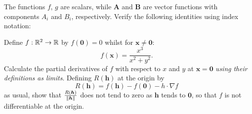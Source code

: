 
\setcounter{question}{36}
\question The functions $f$, $g$ are scalars, while $\bm A$ and $\bm B$ are vector functions with components $A_i$ and $B_i$, respectively. Verify the following identities using index notation:

\setcounter{question}{46}
\question Define $f: \mathbb{R}^2 \to \mathbb{R}$ by $f(\bm 0) = 0$ whilst for $\bm x \neq \bm 0$:
\[ f(\bm x) = \frac{x^3}{x^2 + y^2}. \]
Calculate the partial derivatives of $f$ with respect to $x$ and $y$ at $\bm x = \bm 0$ \emph{using their definitions as limits}. 
Defining $R(\bm h)$ at the origin by
\[R(\bm h) = f(\bm h) - f(\bm 0) - h \cdot \nabla f\]
as usual, show that $\frac{R(\bm h)}{\left\lVert\bm h\right\rVert}$ does not tend to zero as $\bm h$ tends to $\bm 0$, so that $f$ is not differentiable at the origin.

